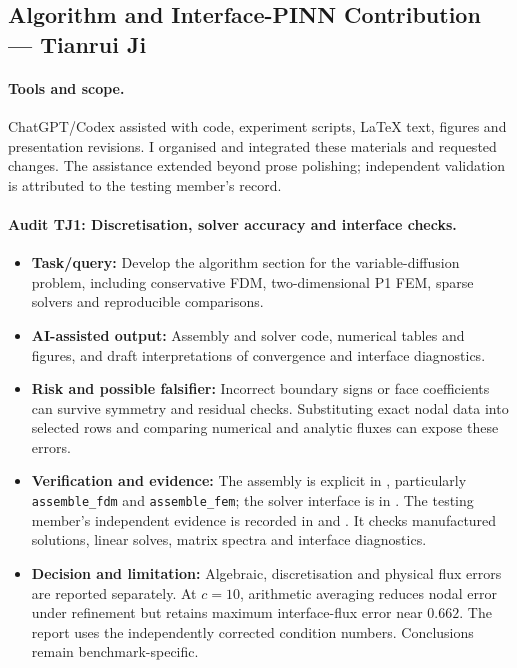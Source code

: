 \subsection*{Algorithm and Interface-PINN Contribution --- Tianrui Ji}
\label{app:ai_tianrui_ji}

\paragraph{Tools and scope.}
ChatGPT/Codex assisted with code, experiment scripts, LaTeX text, figures and
presentation revisions. I organised and integrated these materials and
requested changes. The assistance extended beyond prose polishing;
independent validation is attributed to the testing member's record.

\paragraph{Audit TJ1: Discretisation, solver accuracy and interface checks.}
\begin{itemize}[leftmargin=1.5em,itemsep=2pt]
    \item \textbf{Task/query:} Develop the algorithm section for the
    variable-diffusion problem, including conservative FDM, two-dimensional
    P1 FEM, sparse solvers and reproducible comparisons.
    \item \textbf{AI-assisted output:} Assembly and solver code, numerical
    tables and figures, and draft interpretations of convergence and
    interface diagnostics.
    \item \textbf{Risk and possible falsifier:} Incorrect boundary signs or
    face coefficients can survive symmetry and residual checks. Substituting
    exact nodal data into selected rows and comparing numerical and analytic
    fluxes can expose these errors.
    \item \textbf{Verification and evidence:} The assembly is explicit in
    , particularly
    \texttt{assemble\_fdm} and \texttt{assemble\_fem}; the solver interface
    is in . The testing
    member's independent evidence is recorded in
     and
    . It checks manufactured solutions, linear
    solves, matrix spectra and interface diagnostics.
    \item \textbf{Decision and limitation:} Algebraic, discretisation and
    physical flux errors are reported separately. At $c=10$, arithmetic
    averaging reduces nodal error under refinement but retains maximum
    interface-flux error near $0.662$. The report uses the independently
    corrected condition numbers. Conclusions remain benchmark-specific.
\end{itemize}

